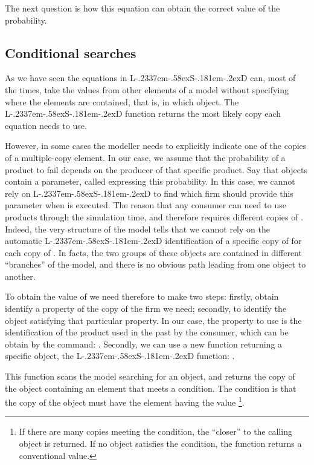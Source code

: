\documentclass [11pt,a4paper] {book}
\def\LsD{{L\kern-.2337em\lower-.58ex\hbox{S}\kern-.181em\lower-.2ex\hbox{D}}\xspace}
\begin{document}
The next question is how this equation can obtain the correct value of the probability.

\subsection{Conditional searches}

As we have seen the equations in \LsD can, most of the times, take the values from other elements of a model without specifying where the elements are contained, that is, in which object. The  \LsD function returns the most likely copy each equation needs to use. 


However, in some cases the modeller needs to explicitly indicate one of the copies of a multiple-copy element. In our case, we assume that the probability of a product to fail depends on the producer of that specific product. Say that objects  contain a parameter, called  expressing this probability. In this case, we cannot rely on \LsD to find which firm should provide this parameter when  is executed. The reason that any consumer can need to use products through the simulation time, and therefore requires different copies of . Indeed, the very structure of the model tells that we cannot rely on the automatic \LsD identification of a specific copy of  for each copy of . In facts, the two groups of these objects are contained in different ``branches'' of the model, and there is no obvious path leading from one object to another.

To obtain the value of  we need therefore to make two steps: firstly, obtain identify a property of the copy of the firm we need; secondly, to identify the object satisfying that particular property. In our case, the property to use is the identification of the product used in the past by the consumer, which can be obtain by the command: . Secondly, we can use a new function returning a specific object, the \LsD function: . 

This function scans the model searching for an object, and returns the copy of the object containing an element that meets a condition. The condition is that the copy of the object must have the element  having the value \footnote{If there are many copies meeting the condition, the ``closer'' to the calling object is returned. If no object satisfies the condition, the function returns a conventional value.}.
\end{document}
